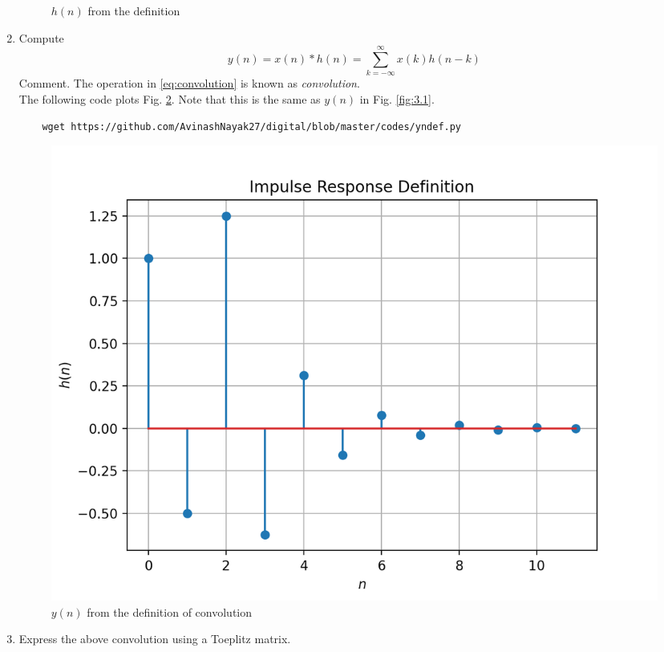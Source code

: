\documentclass[journal,12pt,twocolumn]{IEEEtran}
\renewcommand\thesection{\arabic{section}}
\begin{document}
\begin{enumerate}[label=\thesection.\arabic*]
\begin{figure}[!ht]
        \caption{$h(n)$ from the definition}
        \label{fig:h_n_delta}
      \end{figure}
      \item Compute 
      \begin{equation}
        \label{eq:convolution}
        y(n) = x(n)*h(n) = \sum_{k=-\infty}^{\infty}x(k)h(n-k)
      \end{equation}
      Comment. The operation in \eqref{eq:convolution} is known as
      {\em convolution}.
      \\
      \solution The following code plots Fig. \ref{fig:y_n_convo}. Note that this is the same as 
      $y(n)$ in  Fig. 
      \ref{fig:3.1}. 
      \begin{lstlisting}
    wget https://github.com/AvinashNayak27/digital/blob/master/codes/yndef.py
      \end{lstlisting}
      \begin{figure}[!ht]
        \centering
        \includegraphics[width=\columnwidth]{figs/yndef.png}
        \caption{$y(n)$ from the definition of convolution}
        \label{fig:y_n_convo}
      \end{figure}
        \item Express the above convolution using a Toeplitz matrix.\\
      \solution 
      \begin{figure}
        \centering

\end{figure}
\end{enumerate}
\end{document}
